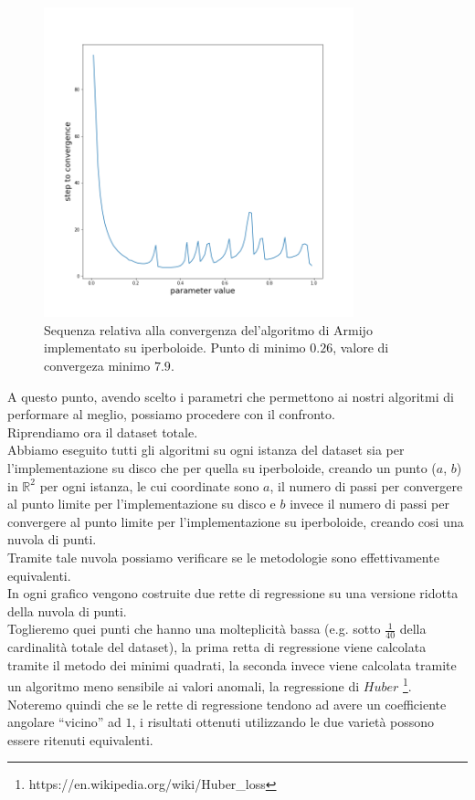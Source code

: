 \documentclass[a4paper, 12pt]{article}
\begin{document}
\begin{figure}[H] %
    \centering\includegraphics[width=0.8\textwidth]{armijo_parameter_hyperboloid.png}
    \caption{Sequenza relativa alla convergenza del'algoritmo di Armijo implementato su iperboloide. Punto di minimo $0.26$, valore di convergeza minimo $7.9$.}
\end{figure}
A questo punto, avendo scelto i parametri che permettono ai nostri algoritmi di performare al meglio, possiamo procedere con il confronto.\\
Riprendiamo ora il dataset totale.\\
Abbiamo eseguito tutti gli algoritmi su ogni istanza del dataset sia per l'implementazione su disco che per quella su iperboloide, creando un punto  ($a$, $b$) in $\mathbb{R}^2$ per ogni istanza, le cui coordinate sono $a$, il numero di passi per convergere al punto limite per l'implementazione su disco e $b$ invece il numero di passi per convergere al punto limite per l'implementazione su iperboloide, creando cosi una nuvola di punti.\\
Tramite tale nuvola possiamo verificare se le metodologie sono effettivamente equivalenti.\\
In ogni grafico vengono costruite due rette di regressione su una versione ridotta della nuvola di punti.\\
Toglieremo quei punti che hanno una molteplicità bassa (e.g. sotto $\frac{1}{40}$ della cardinalità totale del dataset), la prima retta di regressione viene calcolata tramite il metodo dei minimi quadrati, la seconda invece viene calcolata tramite un algoritmo meno sensibile ai valori anomali, la regressione di $Huber$ \footnote{https://en.wikipedia.org/wiki/Huber\_loss}. Noteremo quindi che se le rette di regressione tendono ad avere un coefficiente angolare ``vicino'' ad $1$, i risultati ottenuti utilizzando le due varietà possono essere ritenuti equivalenti.\\
\end{document}
